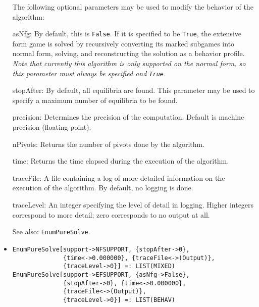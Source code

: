 \begin{itemize}
The following optional parameters may be used to modify the behavior
of the algorithm:
\bd
\item
[asNfg:] By default, this is \verb+False+.  If it is specified to be
\verb+True+, the extensive form game is solved by recursively converting
its marked subgames into normal form, solving, and reconstructing the
solution as a behavior profile.  {\it Note that currently this algorithm
is only supported on the normal form, so this parameter
must always be specified and {\tt True}.} 
\item
[stopAfter:] By default, all equilibria are found.  This parameter may
be used to specify a maximum number of equilibria to be found.
\item
[precision:] Determines the precision of the computation. Default is
machine precision (floating point). 
\item
[nPivots:] Returns the number of pivots done by the
algorithm.
\item
[time:] Returns the time elapsed during the execution
of the algorithm.
\item
[traceFile:] A file containing a log of more detailed information on the
execution of the algorithm.  By default, no logging is done.
\item
[traceLevel:] An integer specifying the level of detail in logging.
Higher integers correspond to more detail; zero corresponds to no output
at all.
\ed
\item [See also:] \verb+EnumPureSolve+.
\ed

\item{}
\protect \large \begin{verbatim}
EnumPureSolve[support->NFSUPPORT, {stopAfter->0}, 
              {time<->0.000000}, {traceFile<->(Output)},
              {traceLevel->0}] =: LIST(MIXED) 
EnumPureSolve[support->EFSUPPORT, {asNfg->False}, 
              {stopAfter->0}, {time<->0.000000},
              {traceFile<->(Output)}, 
              {traceLevel->0}] =: LIST(BEHAV) 
\end{verbatim}\normalsize


\end{itemize}
